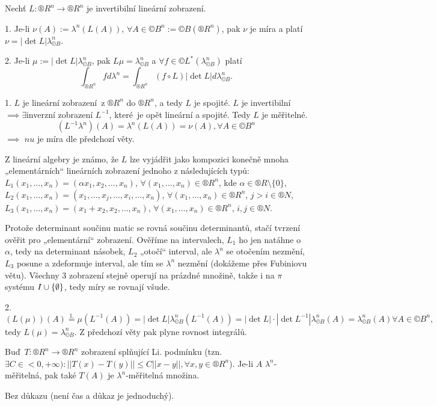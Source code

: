 \documentclass[12pt]{article}					%
\begin{document}
\begin{veta}
	Nechť $L: ®R^n \rightarrow ®R^n$ je invertibilní lineární zobrazení.

	1. Je-li $\nu(A) := \lambda^n(L(A))$, $\forall A \in ©B^n := ©B(®R^n)$, pak $\nu$ je míra a platí $\nu = |\det L|\lambda_{©B}^n$.

	2. Je-li $\mu := |\det L| \lambda_{©B}^n$, pak $L \mu = \lambda_{©B}^n$ a $\forall f \in ©L^*(\lambda_{©B}^n)$ platí
	$$ \int_{®R^n} f d\lambda^n = \int_{®R^n} (f\circ L) |\det L| d\lambda_{©B}^n. $$

	\begin{dukazin}
		1. $L$ je lineární zobrazení z $®R^n$ do $®R^n$, a tedy $L$ je spojité. $L$ je invertibilní $\implies \exists$inverzní zobrazení $L^{-1}$, které je opět lineární a spojité. Tedy $L$ je měřitelné.
		$$ (L^{-1}\lambda^n)(A) = \lambda^n(L(A)) = \nu(A), \forall A \in ©B^n $$
		$\implies$ $nu$ je míra dle předchozí věty.

		Z lineární algebry je známo, že $L$ lze vyjádřit jako kompozici konečně mnoha „elementárních“ lineárních zobrazení jednoho z následujících typů: $L_1(x_1, …, x_n) = (\alpha x_1, x_2, …, x_n)$, $\forall (x_1, …, x_n) \in ®R^n$, kde $\alpha \in ®R\setminus\{0\}$, $L_2(x_1, …, x_n) = (x_1, …, x_j, …, x_i, …, x_n)$, $\forall (x_1, …, x_n) \in ®R^n$, $j > i \in ®N$, $L_3(x_1, …, x_n) = (x_1 + x_2, x_2, …, x_n)$, $\forall (x_1, …, x_n) \in ®R^n$, $i, j \in ®N$.

		Protože determinant součinu matic se rovná součinu determinantů, stačí tvrzení ověřit pro „elementární“ zobrazení. Ověříme na intervalech, $L_1$ ho jen natáhne o $\alpha$, tedy na determinant násobek, $L_2$ „otočí“ interval, ale $\lambda^n$ se otočením nezmění, $L_3$ posune a zdeformuje interval, ale tím se $\lambda^n$ nezmění (dokážeme přes Fubiniovu větu). Všechny 3 zobrazení stejně operují na prázdné množině, takže i na $\pi$ systému $I \cup \{\emptyset\}$, tedy míry se rovnají všude.

		2.
		$$ (L(\mu))(A) \overset{1.}{=} \mu(L^{-1}(A)) = |\det L| \lambda_{©B}^n(L^{-1}(A)) = |\det L|·|\det L^{-1}| \lambda_{©B}^n(A) = \lambda_{©B}^n(A) \forall A \in ©B^n, $$
		tedy $L(\mu) = \lambda_{©B}^n$. Z předchozí věty pak plyne rovnost integrálů.
	\end{dukazin}

	\begin{lemma}
		Buď $T: ®R^n \rightarrow ®R^n$ zobrazení splňující Li. podmínku (tzn. $\exists C \in <0, +∞): ||T(x) - T(y)|| ≤ C||x - y||, \forall x, y \in ®R^n$). Je-li $A$ $\lambda^n$-měřitelná, pak také $T(A)$ je $\lambda^n$-měřitelná množina.

		\begin{dukazin}
			Bez důkazu (není čas a důkaz je jednoduchý).
		\end{dukazin}
	\end{lemma}
\end{veta}
\end{document}
